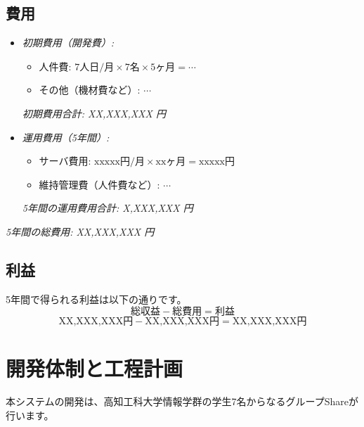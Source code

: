 \documentclass{docs}
\begin{document}
\subsection{費用}
\begin{itemize}
	\item \emph{初期費用（開発費）:}
		\begin{itemize}
			\item 人件費: $\text{7人日/月}\times\text{7名}\times\text{5ヶ月}
			=\cdots$
			\item その他（機材費など）: $\cdots$
		\end{itemize}
		\emph{初期費用合計: XX,XXX,XXX 円}
	\item \emph{運用費用（5年間）:}
		\begin{itemize}
			\item サーバ費用: $\text{xxxxx円/月}\times\text{xxヶ月}
			=\text{xxxxx円}$
			\item 維持管理費（人件費など）: $\cdots$
		\end{itemize}
		\emph{5年間の運用費用合計: X,XXX,XXX 円}
\end{itemize}
\emph{5年間の総費用: XX,XXX,XXX 円}

\subsection{利益}
5年間で得られる利益は以下の通りです。
$$
\text{総収益} - \text{総費用} = \text{利益}
$$
$$
\text{XX,XXX,XXX円} - \text{XX,XXX,XXX円} = \text{XX,XXX,XXX円}
$$

\section{開発体制と工程計画}

本システムの開発は、高知工科大学情報学群の学生7名からなるグループShareが
行います。
\end{document}
